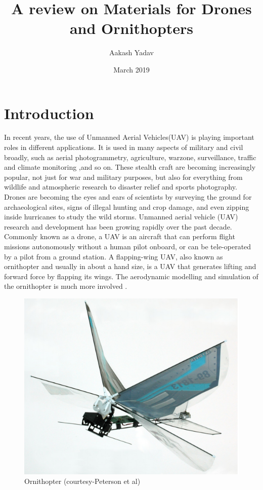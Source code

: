 \documentclass{article}
\title{A review on Materials for Drones and Ornithopters}
\author{Aakash Yadav }
\date{March 2019}
\begin{document}
\maketitle

\section{Introduction}
In recent years, the use of Unmanned Aerial Vehicles(UAV) is playing important roles in different applications. It is used in many aspects of military and civil broadly, such as aerial photogrammetry, agriculture, warzone, surveillance, traffic and climate monitoring ,and so on. These stealth craft are becoming increasingly popular, not just for war and military purposes, but also for everything from wildlife and atmospheric research to disaster relief and sports photography. Drones are becoming the eyes and ears of scientists by surveying the ground for archaeological sites, signs of illegal hunting and crop damage, and even zipping inside hurricanes to study the wild storms. 
 Unmanned aerial vehicle (UAV) research and development has been growing rapidly over the past decade. 
Commonly known as a drone, a UAV is an aircraft that can perform flight missions autonomously without a human pilot onboard, or can be tele-operated by a pilot from a ground station.
A flapping-wing UAV, also known as ornithopter and usually in about a hand size, is a UAV that generates lifting and forward force by flapping its wings. The aerodynamic modelling and simulation of the ornithopter is much more involved \citep{peterson}.

\begin{figure}[h!]
\centering
\includegraphics[scale=0.3]{dfm1}
\caption{Ornithopter (courtesy-Peterson et al)}
\label{fig:universe}
\end{figure}
\end{document}
